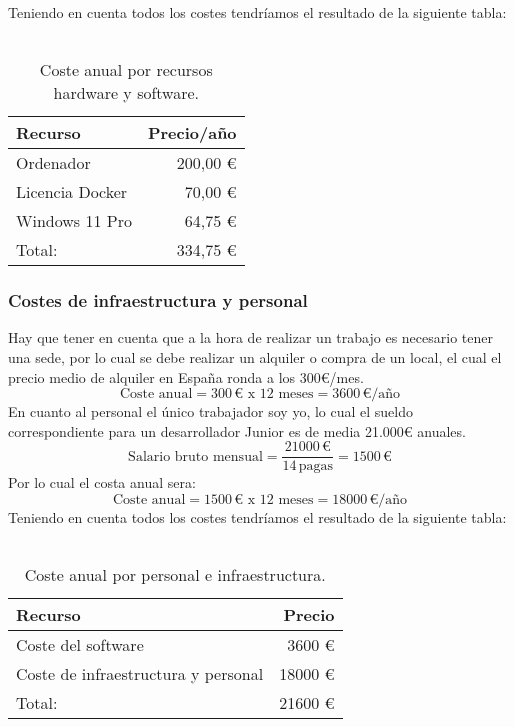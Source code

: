 Teniendo en cuenta todos los costes tendríamos el resultado de la siguiente tabla:
\\
\\
\begin{table}[H]
    \centering
    \begin{tabular}{@{}|l|r|@{}}
        \toprule
        Recurso & Precio/año \\ \midrule
        Ordenador & 200,00 € \\ 
        Licencia Docker & 70,00 € \\ 
        Windows 11 Pro & 64,75 € \\ \midrule
        Total: & 334,75 € \\ \bottomrule
    \end{tabular}
    \caption{Coste anual por recursos hardware y software.}
\end{table}

\subsubsection{Costes de infraestructura y personal}
Hay que tener en cuenta que a la hora de realizar un trabajo es necesario tener una sede, por lo cual se debe realizar un alquiler o compra de un local, el cual el precio medio de alquiler en España ronda a los 300€/mes.
\begin{equation}
    \text{Coste anual} = 300\,\text{€ x 12 meses} = 3600\,\text{€/año}
\end{equation}
En cuanto al personal el único trabajador soy yo, lo cual el sueldo correspondiente para un desarrollador Junior es de media 21.000€ anuales.
\begin{equation}
    \text{Salario bruto mensual} = \frac{21000\,\text{€}}{14\,\text{pagas}} = 1500\,\text{€}
\end{equation}
Por lo cual el costa anual sera:
\begin{equation}
    \text{Coste anual} = 1500\,\text{€ x 12 meses} = 18000\,\text{€/año}
\end{equation}
Teniendo en cuenta todos los costes tendríamos el resultado de la siguiente tabla:
\\
\\
\begin{table}[H]
    \centering
    \begin{tabular}{@{}|l|r|@{}}
         \toprule
        Recurso & Precio \\ \midrule
        Coste del software & 3600 € \\ 
        Coste de infraestructura y personal & 18000 € \\ \midrule
        Total: & 21600 € \\ \bottomrule 
    \end{tabular}
    \caption{Coste anual por personal e infraestructura.}
\end{table}

